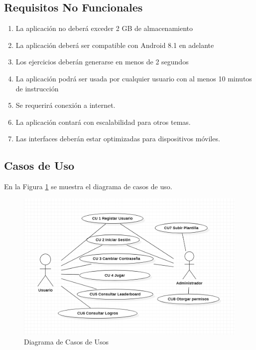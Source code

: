 \documentclass{article}
\begin{document}
\subsection{Requisitos No Funcionales}
\begin{enumerate}
\item {La aplicación no deberá exceder 2 GB de almacenamiento}
\item {La aplicación deberá ser compatible con Android 8.1 en adelante}
\item {Los ejercicios deberán generarse en menos de 2 segundos}
\item {La aplicación podrá ser usada por cualquier usuario con al menos 10 minutos de instrucción}
\item {Se requerirá conexión a internet.}
\item {La aplicación contará con escalabilidad para otros temas.}
\item {Las interfaces deberán estar optimizadas para dispositivos móviles.}
\end{enumerate}

\subsection{Casos de Uso}

En la Figura \ref{fig:analisis_01} se muestra el diagrama de casos de uso.

\begin{figure}[h]
    \centering
    \includegraphics[scale=0.7]{imgs/CasosDeUso}
    \caption{Diagrama de Casos de Usos}
    \label{fig:analisis_01}
\end{figure}
\end{document}
